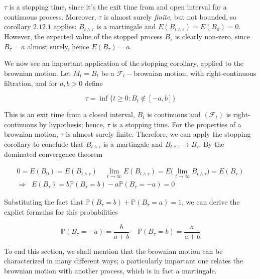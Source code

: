 $\tau$ is a stopping time, since it's the exit time from and open interval for a continuous process. Moreover, $\tau$ is almost surely \textit{finite}, but not bounded, so corollary $2.12.1$ applies: $B_{t \wedge \tau}$ is a martingale and $E(B_{t \wedge \tau}) = E(B_0) = 0$. However, the expected value of the stopped process $B_{\tau}$ is clearly non-zero, since $B_{\tau} = a$ almost surely, hence $E(B_{\tau}) = a$. 

We now see an important application of the stopping corollary, applied to the brownian motion. Let $M_t = B_t$ be a $\mathcal{F}_t-$brownian motion, with right-continuous filtration, and for $a,b > 0$ define 

\begin{equation*}
    \tau = \inf\big\{ t \geq 0 : B_t \notin [-a,b] \big\}
\end{equation*}

This is an exit time from a closed interval, $B_t$ is continuous and $(\mathcal{F}_t)$ is right-continuous by hypothesis; hence, $\tau$ is a stopping time. For the properties of a brownian motion, $\tau$ is almost surely finite. Therefore, we can apply the stopping corollary to conclude that $B_{t \wedge \tau}$ is a martingale and $B_{t \wedge \tau} \to B_{\tau}$. 
By the dominated convergence theorem

\begin{gather*}
    0 = E(B_0) = E(B_{t \wedge \tau}) \;\;\;\; \lim_{t \to \infty} E(B_{t \wedge \tau}) = E\Big( \lim_{t \to \infty} B_{t \wedge \tau} \Big) = E(B_{\tau}) \\
    \Rightarrow \;\; E(B_{\tau}) = b \mathbb{P}(B_{\tau} = b) - a \mathbb{P}(B_{\tau} = -a) = 0
\end{gather*}

Substituting the fact that $\mathbb{P}(B_{\tau} = b) + \mathbb{P}(B_{\tau}=a) = 1$, we can derive the explict formulas for this probabilities 

\begin{equation*}
    \mathbb{P}(B_{\tau} = -a) = \frac{b}{a+b} \;\;\;\; \mathbb{P}(B_{\tau} = b) = \frac{a}{a+b}
\end{equation*}

To end this section, we shall mention that the brownian motion can be characterized in many different ways; a particularly important one relates the brownian motion with another process, which is in fact a martingale. 

